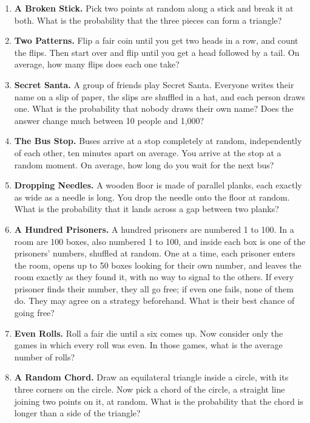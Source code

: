 \documentclass[11pt,a4paper]{article}
\begin{document}
\begin{enumerate}
    \item \textbf{A Broken Stick.} Pick two points at random along a stick and break it at both. What is the probability that the three pieces can form a triangle?

    \item \textbf{Two Patterns.} Flip a fair coin until you get two heads in a row, and count the flips. Then start over and flip until you get a head followed by a tail. On average, how many flips does each one take?

    \item \textbf{Secret Santa.} A group of friends play Secret Santa. Everyone writes their name on a slip of paper, the slips are shuffled in a hat, and each person draws one. What is the probability that nobody draws their own name? Does the answer change much between 10 people and 1,000?

    \item \textbf{The Bus Stop.} Buses arrive at a stop completely at random, independently of each other, ten minutes apart on average. You arrive at the stop at a random moment. On average, how long do you wait for the next bus?

    \item \textbf{Dropping Needles.} A wooden floor is made of parallel planks, each exactly as wide as a needle is long. You drop the needle onto the floor at random. What is the probability that it lands across a gap between two planks?

    \item \textbf{A Hundred Prisoners.} A hundred prisoners are numbered 1 to 100. In a room are 100 boxes, also numbered 1 to 100, and inside each box is one of the prisoners' numbers, shuffled at random. One at a time, each prisoner enters the room, opens up to 50 boxes looking for their own number, and leaves the room exactly as they found it, with no way to signal to the others. If every prisoner finds their number, they all go free; if even one fails, none of them do. They may agree on a strategy beforehand. What is their best chance of going free?

    \item \textbf{Even Rolls.} Roll a fair die until a six comes up. Now consider only the games in which every roll was even. In those games, what is the average number of rolls?

    \item \textbf{A Random Chord.} Draw an equilateral triangle inside a circle, with its three corners on the circle. Now pick a chord of the circle, a straight line joining two points on it, at random. What is the probability that the chord is longer than a side of the triangle?
\end{enumerate}
\end{document}

